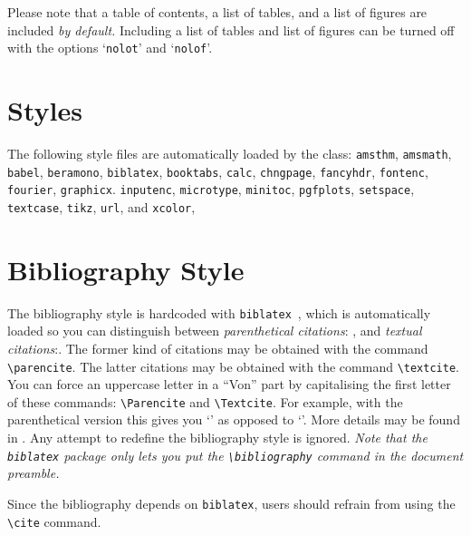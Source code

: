 \documentclass[MScCS]{uccthesis}
\newcommand*{\COMMAND}[1]{\texttt{\textbackslash #1}}
\begin{document}
      Please note that a table of contents,
       a list of tables, and
       a list of figures are included \emph{by default.}
      Including a list of tables and list of figures
       can be turned off with the options
       `\texttt{nolot}' and `\texttt{nolof}'.

   \section{Styles}

      The following style files are automatically loaded by
       the class:
       \texttt{amsthm},
       \texttt{amsmath},
       \texttt{babel},
       \texttt{beramono},
       \texttt{biblatex},
       \texttt{booktabs},
       \texttt{calc},
       \texttt{chngpage},
       \texttt{fancyhdr},
       \texttt{fontenc},
       \texttt{fourier},
       \texttt{graphicx}.
       \texttt{inputenc},
       \texttt{microtype},
       \texttt{minitoc},
       \texttt{pgfplots},
       \texttt{setspace},
       \texttt{textcase},
       \texttt{tikz},
       \texttt{url}, and
       \texttt{xcolor},

   \section{Bibliography Style}

      The bibliography style is hardcoded
       with \texttt{biblatex}~\parencite{biblatex}, which
       is automatically loaded so you can
       distinguish between
       \emph{parenthetical citations}: \parencite{biblatex}, and
       \emph{textual citations}:\textcite{biblatex}.
      The former kind of citations may be obtained
       with the command \COMMAND{parencite}.
      The latter citations may be obtained
       with the command \COMMAND{textcite}.
      You can force an uppercase letter in a ``Von'' part by
       capitalising the first letter of these commands:
       \COMMAND{Parencite} and
       \COMMAND{Textcite}.
      For example,
       with the parenthetical version this gives you
       `\Textcite{LAF}' as opposed to `\textcite{LAF}'.
      More details may be found in \Textcite{LAF}.
      Any attempt to redefine the bibliography style is ignored.
      \emph{Note that the \texttt{biblatex} package
             only lets you put the \COMMAND{bibliography}
             command in the document preamble.}

      Since the bibliography depends on \texttt{biblatex},
       users should refrain from using the \COMMAND{cite} command.
\end{document}
